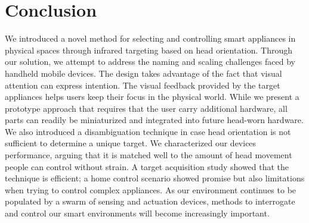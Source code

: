 \section{Conclusion}
We introduced a novel method for selecting and controlling smart appliances in physical spaces through infrared targeting based on head orientation. Through our solution, we attempt to address the naming and scaling challenges faced by handheld mobile devices. The design takes advantage of the fact that visual attention can express intention. The visual feedback provided by the target appliances helps users keep their focus in the physical world. While we present a prototype approach that requires that the user carry additional hardware, all parts can readily be miniaturized and integrated into future head-worn hardware. We also introduced a disambiguation technique in case head orientation is not sufficient to determine a unique target. We characterized our devices performance, arguing that it is matched well to the amount of head movement people can control without strain. A target acquisition study showed that the technique is efficient; a home control scenario showed promise but also limitations when trying to control complex appliances. As our environment continues to be populated by a swarm of sensing and actuation devices, methods to interrogate and control our smart environments will become increasingly important.
